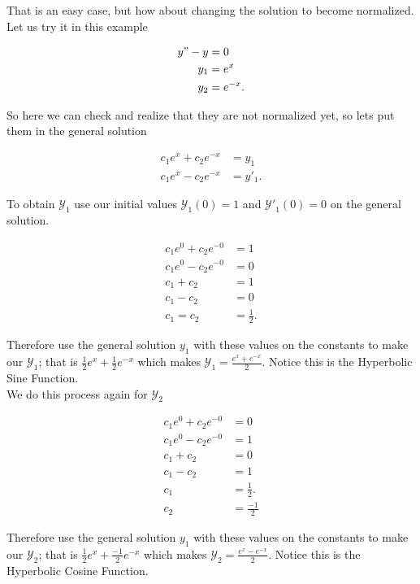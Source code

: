 \documentclass[12pt]{article}
\begin{document}
That is an easy case, but how about changing the solution to become normalized. Let us try it in this example

\begin{align*}
    y"-y &= 0 \\
    y_1 &= e^x \\
    y_2 &= e^{-x}.
\end{align*}

So here we can check and realize that they are not normalized yet, so lets put them in the general solution

\begin{align*}
    c_1e^x+c_2e^{-x} &= y_1 \\
    c_1e^x-c_2e^{-x} &= y'_1.
\end{align*}

To obtain $\mathcal{Y}_1$ use our initial values $\mathcal{Y}_1(0)=1$ and $\mathcal{Y'}_1(0)=0$ on the general solution.

\begin{align*}
    c_1e^0+c_2e^{-0} &= 1 \\
    c_1e^0-c_2e^{-0} &= 0 \\
    c_1+c_2 &= 1 \\
    c_1-c_2 &= 0 \\
    c_1=c_2 &= \frac{1}{2}.
\end{align*}

Therefore use the general solution $y_1$ with these values on the constants to make our $\mathcal{Y}_1$; that is $\frac{1}{2} e^x+ \frac{1}{2} e^{-x}$ which makes $\mathcal{Y}_1=\frac{e^x+e^{-x}}{2}$. Notice this is the Hyperbolic Sine Function. \\

We do this process again for $\mathcal{Y}_2$

\begin{align*}
    c_1e^0+c_2e^{-0} &= 0 \\
    c_1e^0-c_2e^{-0} &= 1 \\
    c_1+c_2 &= 0 \\
    c_1-c_2 &= 1 \\
    c_1 &= \frac{1}{2}. \\
    c_2 &= \frac{-1}{2}
\end{align*}

Therefore use the general solution $y_1$ with these values on the constants to make our $\mathcal{Y}_2$; that is $\frac{1}{2} e^x+ \frac{-1}{2} e^{-x}$ which makes $\mathcal{Y}_2=\frac{e^x-e^{-x}}{2}$. Notice this is the Hyperbolic Cosine Function. \\
\end{document}
